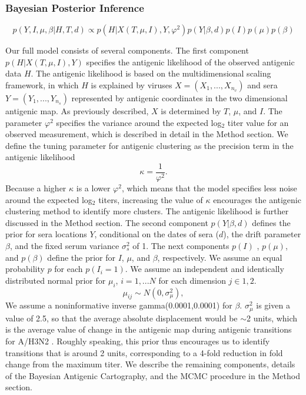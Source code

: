 \documentclass[11pt,oneside,letterpaper]{article}
\newcommand{\mdssd}{\varphi}						%
\begin{document}
\subsubsection*{Bayesian Posterior Inference}

\begin{equation}
  p(Y, I, \mu ,  \beta | H, T, d) \propto  p(H| X(T, \mu, I), Y , \mdssd^2) p(Y|  \beta, d) p(I) p(\mu) p(\beta)
\end{equation}

Our full model consists of several components.
The first component $p(H|X(T, \mu, I),Y )$ specifies the antigenic likelihood of the observed antigenic data $H$.
The antigenic likelihood is based on the multidimensional scaling framework, in which $H$ is explained by viruses $X=(X_1, ..., X_{n_v} )$ and sera $Y = (Y_1, ..., Y_{n_{s}} )$ represented by antigenic coordinates in the two dimensional antigenic map.
As previously described, $X$ is determined by $T$, $\mu$, and $I$.
The parameter $\mdssd^2$ specifies the variance around the expected log$_2$ titer value for an observed measurement, which is described in detail in the Method section.
We define the tuning parameter for antigenic clustering as the precision term in the antigenic likelihood
\begin{equation}
  \kappa = \frac{1}{\mdssd^2}.
\end{equation}
Because a higher $\kappa$ is a lower $\mdssd^2$, which means that the model specifies less noise around the expected log$_2$ titers, increasing the value of $\kappa$ encourages the antigenic clustering method to identify more clusters.
The antigenic likelihood is further discussed in the Method section.
The second component $p(Y|  \beta , d)$ defines the prior for sera locations $Y$, conditional on the dates of sera ($d$), the drift parameter $\beta$, and the fixed serum variance $\sigma^2_s$ of 1. 
The next components $p(I)$ , $p(\mu)$, and $p(\beta)$ define the prior for $I$, $\mu$, and $\beta$, respectively.
We assume an equal probability $p$ for each $p(I_i = 1)$.
We assume an independent and identically distributed normal prior for $\mu_i$, $i=1,...N$ for each dimension $j \in {1,2}$.
\begin{equation}
   \mu_{ij}  \sim N( 0 , \sigma^2_\mu)			,
\end{equation}
We assume a noninformative inverse gamma(0.0001,0.0001) for $\beta$.
$\sigma^2_\mu$ is given a value of 2.5, so that the average absolute displacement would be $\sim$2 units, which is the average value of change in the antigenic map during antigenic transitions for A/H3N2 \cite{jong_antigenic_2007}.
Roughly speaking, this prior thus encourages us to identify transitions that is around 2 units, corresponding to a 4-fold reduction in fold change from the maximum titer.
We describe the remaining components, details of the Bayesian Antigenic Cartography, and the MCMC procedure in the Method section.
\end{document}
